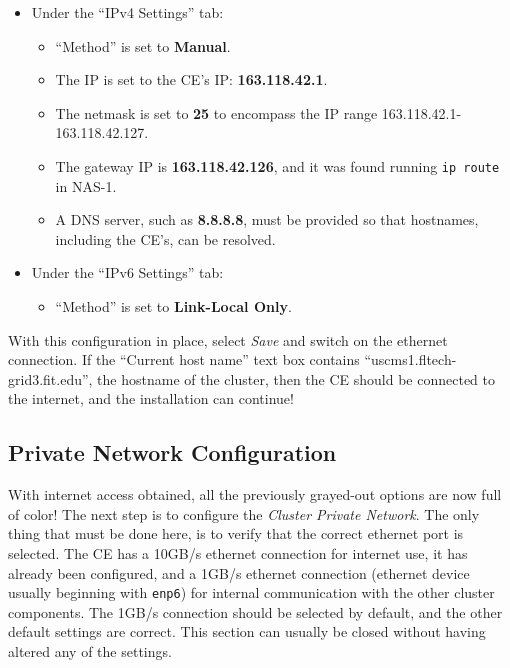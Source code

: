 \documentclass[12pt]{article}
\begin{document}
\begin{itemize}
\item Under the ``IPv4 Settings'' tab:
  \begin{itemize}
  \item ``Method'' is set to \textbf{Manual}.
  \item The IP is set to the CE's IP: \textbf{163.118.42.1}.
  \item The netmask is set to \textbf{25} to encompass the IP range
    163.118.42.1-163.118.42.127.
  \item The gateway IP is \textbf{163.118.42.126}, and it was found running
    {\tt ip route} in NAS-1.
  \item A DNS server, such as \textbf{8.8.8.8}, must be provided so that
    hostnames, including the CE's, can be resolved.
  \end{itemize}
\item Under the ``IPv6 Settings'' tab:
  \begin{itemize}
  \item ``Method'' is set to \textbf{Link-Local Only}.
  \end{itemize}
\end{itemize}

\qq With this configuration in place, select \textit{Save} and switch on the
ethernet connection. If the ``Current host name'' text box contains
``uscms1.fltech-grid3.fit.edu'', the hostname of the cluster, then the CE should
be connected to the internet, and the installation can continue!

\subsection{Private Network Configuration}

\qq With internet access obtained, all the previously grayed-out options are now
full of color! The next step is to configure the \textit{Cluster Private
  Network}. The only thing that must be done here, is to verify that the correct
ethernet port is selected. The CE has a 10GB/s ethernet connection for internet
use, it has already been configured, and a 1GB/s ethernet connection (ethernet
device usually beginning with {\tt enp6}) for internal communication with the
other cluster components. The 1GB/s connection should be selected by default,
and the other default settings are correct. This section can usually be closed
without having altered any of the settings.
\end{document}
